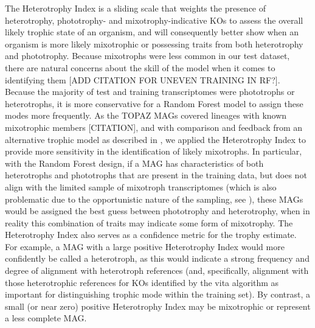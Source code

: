 \documentclass[12pt]{article}
\numberwithin{equation}{section}
\begin{document}
The Heterotrophy Index is a sliding scale that weights the presence of heterotrophy, phototrophy- and mixotrophy-indicative KOs to assess the overall likely trophic state of an organism, and will consequently better show when an organism is more likely mixotrophic or possessing traits from both heterotrophy and phototrophy. Because mixotrophs were less common in our test dataset, there are natural concerns about the skill of the model when it comes to identifying them [ADD CITATION FOR UNEVEN TRAINING IN RF?]. Because the majority of test and training transcriptomes were phototrophs or heterotrophs, it is more conservative for a Random Forest model to assign these modes more frequently. As the TOPAZ MAGs covered lineages with known mixotrophic members [CITATION], and with comparison and feedback from an alternative trophic model as described in , we applied the Heterotrophy Index to provide more sensitivity in the identification of likely mixotrophs. In particular, with the Random Forest design, if a MAG has characteristics of both heterotrophs and phototrophs that are present in the training data, but does not align with the limited sample of mixotroph transcriptomes (which is also problematic due to the opportunistic nature of the sampling, see  ), these MAGs would be assigned the best guess between phototrophy and heterotrophy, when in reality this combination of traits may indicate some form of mixotrophy. The Heterotrophy Index also serves as a confidence metric for the trophy estimate. For example, a MAG with a large positive  Heterotrophy Index would more confidently be called a heterotroph, as this would indicate a strong frequency and degree of alignment with heterotroph references (and, specifically, alignment with those heterotrophic references for KOs identified by the vita algorithm as important for distinguishing trophic mode within the training set). By contrast, a small (or near zero) positive Heterotrophy Index may be mixotrophic or represent a less complete MAG. 
\end{document}
